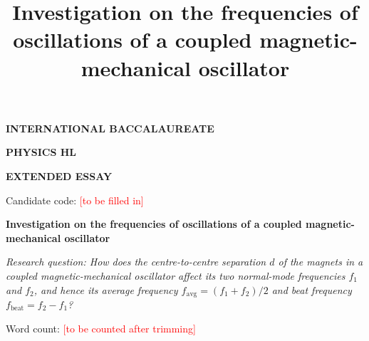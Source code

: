 \documentclass[12pt,a4paper]{article}
\title{Investigation on the frequencies of oscillations of a coupled magnetic-mechanical oscillator}
\newcommand{\TBM}[1]{\textcolor{red}{[#1]}}          %
\begin{document}
\begin{titlepage}
\centering
\vspace*{2cm}
{\Large\bfseries INTERNATIONAL BACCALAUREATE\par}
\vspace{0.6cm}
{\Large\bfseries PHYSICS HL\par}
\vspace{0.6cm}
{\Large\bfseries EXTENDED ESSAY\par}
\vspace{2.5cm}
{\large Candidate code: \TBM{to be filled in}\par}
\vspace{2.5cm}
{\LARGE\bfseries Investigation on the frequencies of oscillations of a coupled magnetic-mechanical oscillator\par}
\vspace{1.5cm}
{\large\itshape Research question: How does the centre-to-centre separation $d$ of the magnets in a coupled magnetic-mechanical oscillator affect its two normal-mode frequencies $f_1$ and $f_2$, and hence its average frequency $f_{\mathrm{avg}}=(f_1+f_2)/2$ and beat frequency $f_{\mathrm{beat}}=f_2-f_1$?\par}
\vfill
{\large Word count: \TBM{to be counted after trimming}\par}
\vspace{1cm}
\end{titlepage}

\tableofcontents
\clearpage
{}















\appendix

\end{document}
